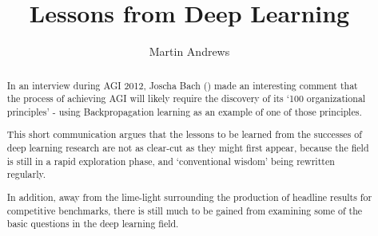 \documentclass[citeauthoryear]{llncs}
\begin{document}
%
\frontmatter          %
%
\pagestyle{headings}  %
%
\mainmatter              %
%
\title{Lessons from Deep Learning}
%
%
\author{Martin Andrews}
%
%
%

\maketitle              %

\begin{abstract}



In an interview  during AGI 2012, Joscha Bach (\cite{Joscha-Bach-2012-interview}) 
made an interesting comment that the process of achieving 
AGI will likely require the discovery of its `100 organizational principles' - 
using Backpropagation learning as an example of one of those principles.  

This short communication argues that the lessons to be learned from 
the successes of deep learning research are not as clear-cut as they might first appear,
because the field is still in a rapid exploration phase, and `conventional wisdom' 
being rewritten regularly.

In addition, away from the lime-light surrounding the production of 
headline results for competitive benchmarks, there is still much to be 
gained from examining some of the basic questions in the deep learning field.

\end{abstract}
%
\end{document}
